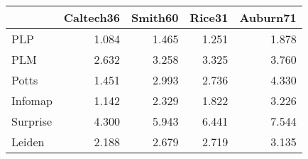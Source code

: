 \begin{tabular}{lrrrr}
\toprule
{} & Caltech36 & Smith60 & Rice31 & Auburn71 \\
\midrule
PLP      &     1.084 &   1.465 &  1.251 &    1.878 \\
PLM      &     2.632 &   3.258 &  3.325 &    3.760 \\
Potts    &     1.451 &   2.993 &  2.736 &    4.330 \\
Infomap  &     1.142 &   2.329 &  1.822 &    3.226 \\
Surprise &     4.300 &   5.943 &  6.441 &    7.544 \\
Leiden   &     2.188 &   2.679 &  2.719 &    3.135 \\
\bottomrule
\end{tabular}
